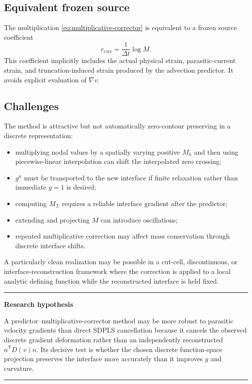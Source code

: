 \documentclass[11pt,a4paper]{article}
\theoremstyle{definition}
\theoremstyle{remark}
\newenvironment{keybox}[1]{%
  \begin{center}\begin{minipage}{0.94\textwidth}
  \color{noteblue}\hrule\vspace{0.5em}
  \textbf{#1}\par\color{black}\vspace{0.3em}
}{%
  \vspace{0.4em}\color{noteblue}\hrule\color{black}
  \end{minipage}\end{center}
}
\begin{document}
\subsection{Equivalent frozen source}

The multiplication \eqref{eq:multiplicative-corrector} is equivalent to a frozen source coefficient
\begin{equation}
  r_{\mathrm{corr}}=\frac1{\Delta t}\log M.
  \label{eq:corrector-source}
\end{equation}
This coefficient implicitly includes the actual physical strain, parasitic-current strain, and truncation-induced strain produced by the advection predictor. It avoids explicit evaluation of $\nabla v$.

\subsection{Challenges}

The method is attractive but not automatically zero-contour preserving in a discrete representation:
\begin{itemize}
  \item multiplying nodal values by a spatially varying positive $M_h$ and then using piecewise-linear interpolation can shift the interpolated zero crossing;
  \item $g^n$ must be transported to the new interface if finite relaxation rather than immediate $g=1$ is desired;
  \item computing $M_\Sigma$ requires a reliable interface gradient after the predictor;
  \item extending and projecting $M$ can introduce oscillations;
  \item repeated multiplicative correction may affect mass conservation through discrete interface shifts.
\end{itemize}

A particularly clean realization may be possible in a cut-cell, discontinuous, or interface-reconstruction framework where the correction is applied to a local analytic defining function while the reconstructed interface is held fixed.

\begin{keybox}{Research hypothesis}
A predictor--multiplicative-corrector method may be more robust to parasitic velocity gradients than direct SDPLS cancellation because it cancels the observed discrete gradient deformation rather than an independently reconstructed $n^{\mathsf T}D(v)n$. Its decisive test is whether the chosen discrete function-space projection preserves the interface more accurately than it improves $g$ and curvature.
\end{keybox}
\end{document}
